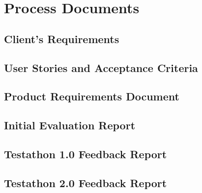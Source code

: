 \chapter{Process Documents}

\section{Client's Requirements}
\label{appendix:client_requirements}


\section{User Stories and Acceptance Criteria}
\label{appendix:user_stories}



\section{Product Requirements Document}
\label{appendix:prd}


\section{Initial Evaluation Report}
\label{appendix:initial_evaluation_report}


\section{Testathon 1.0 Feedback Report}
\label{appendix:testathon_report_1}


\section{Testathon 2.0 Feedback Report}
\label{appendix:testathon_report_2}

